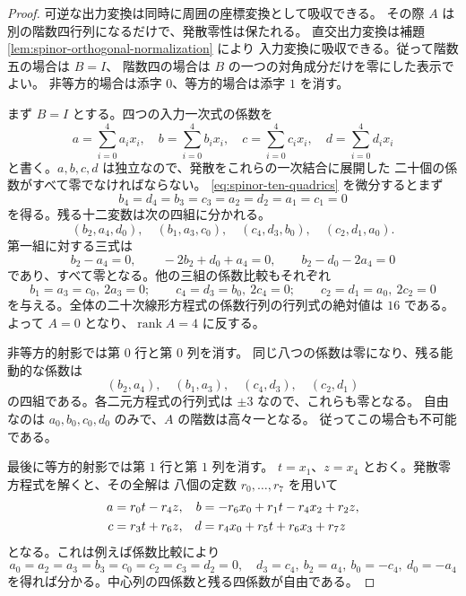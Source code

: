 \begin{proof}
可逆な出力変換は同時に周囲の座標変換として吸収できる。
その際 $A$ は別の階数四行列になるだけで、発散零性は保たれる。
直交出力変換は補題 \ref{lem:spinor-orthogonal-normalization} により
入力変換に吸収できる。従って階数五の場合は $B=I$、
階数四の場合は $B$ の一つの対角成分だけを零にした表示でよい。
非等方的場合は添字 $0$、等方的場合は添字 $1$ を消す。

まず $B=I$ とする。四つの入力一次式の係数を
\[
 a=\sum_{i=0}^4a_i x_i,\quad b=\sum_{i=0}^4b_i x_i,\quad
 c=\sum_{i=0}^4c_i x_i,\quad d=\sum_{i=0}^4d_i x_i
\]
と書く。$a,b,c,d$ は独立なので、発散をこれらの一次結合に展開した
二十個の係数がすべて零でなければならない。
\eqref{eq:spinor-ten-quadrics} を微分するとまず
\[
 b_4=d_4=b_3=c_3=a_2=d_2=a_1=c_1=0
\]
を得る。残る十二変数は次の四組に分かれる。
\[
 (b_2,a_4,d_0),\quad (b_1,a_3,c_0),\quad
 (c_4,d_3,b_0),\quad (c_2,d_1,a_0).
\]
第一組に対する三式は
\[
 b_2-a_4=0,\qquad -2b_2+d_0+a_4=0,\qquad b_2-d_0-2a_4=0
\]
であり、すべて零となる。他の三組の係数比較もそれぞれ
\[
 b_1=a_3=c_0,\ 2a_3=0;\qquad
 c_4=d_3=b_0,\ 2c_4=0;\qquad
 c_2=d_1=a_0,\ 2c_2=0
\]
を与える。全体の二十次線形方程式の係数行列の行列式の絶対値は $16$ である。
よって $A=0$ となり、$\operatorname{rank}A=4$ に反する。

非等方的射影では第 $0$ 行と第 $0$ 列を消す。
同じ八つの係数は零になり、残る能動的な係数は
\[
 (b_2,a_4),\quad(b_1,a_3),\quad(c_4,d_3),\quad(c_2,d_1)
\]
の四組である。各二元方程式の行列式は $\pm3$ なので、これらも零となる。
自由なのは $a_0,b_0,c_0,d_0$ のみで、$A$ の階数は高々一となる。
従ってこの場合も不可能である。

最後に等方的射影では第 $1$ 行と第 $1$ 列を消す。
$t=x_1$、$z=x_4$ とおく。発散零方程式を解くと、その全解は
八個の定数 $r_0,\ldots,r_7$ を用いて
\begin{align}
 a&=r_0t-r_4z,&
 b&=-r_6x_0+r_1t-r_4x_2+r_2z,\notag\\
 c&=r_3t+r_6z,&
 d&=r_4x_0+r_5t+r_6x_3+r_7z
 \label{eq:isotropic-input-linear-forms}
\end{align}
となる。これは例えば係数比較により
\[
 a_0=a_2=a_3=b_3=c_0=c_2=c_3=d_2=0,
 \quad d_3=c_4,\ b_2=a_4,\ b_0=-c_4,\ d_0=-a_4
\]
を得れば分かる。中心列の四係数と残る四係数が自由である。


\end{proof}
